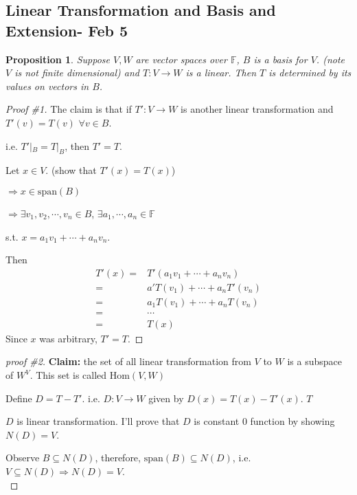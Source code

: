 \documentclass[12pt]{article}
\newtheorem{proposition}{Proposition}[subsection]
\newcommand{\Span}{\mathrm{span}}
\newcommand{\Hom}{\mathrm{Hom}}
\newcommand{\mF}{{\mathbb{F}}}
\begin{document}
	\subsection{Linear Transformation and Basis and Extension- Feb 5}
	\begin{proposition}
		Suppose $V, W$ are vector spaces over $\mF$, $B$ is a basis for $V$. 
		(note $V$ is not finite dimensional) and $T: V\to W$ is a linear.		
		Then $T$ is determined by its values on vectors in $B$. 
	\end{proposition}
	\begin{proof}[Proof \#1]
		The claim is that if $T': V\to W$ is another linear transformation
		and $T'(v) = T(v)$ $\forall v\in B$.

		i.e. $T'|_{B} = T|_B$, then $T' = T$. 

		Let $x \in V$. (show that $T'(x) = T(x)$) 
		\begin{description}
			\item $\Rightarrow x \in \Span(B)$
			\item $\Rightarrow \exists v_1, v_2,\cdots, v_n \in B$, 
				$\exists a_1,\cdots,a_n \in \mF$
		\end{description}
		s.t. $x = a_1v_1+\cdots+a_nv_n$. 
		
		Then 
		\begin{align*}	
			T'(x) 
			=& T'(a_1v_1+\cdots + a_nv_n) \\
			=& a'T(v_1)+\cdots+a_nT'(v_n) \\
			=& a_1T(v_1) + \cdots + a_nT(v_n)\\
			=& \cdots \\
			=& T(x) 
		\end{align*}
		Since $x$ was arbitrary, $T' = T$. 
	\end{proof}
	\begin{proof}[proof \#2]
		\textbf{Claim:} the set of all linear transformation from $V$ to $W$ 
		is a subspace of $W^V$. This set is called $\Hom(V,W)$

		Define $D = T-T'$.
		i.e. $D : V \to W$ given by $D(x) = T(x) - T'(x)$. $T$

		$D$ is linear transformation. I'll prove that $D$ is constant $0$
		function by showing $N(D) = V$. 

		Observe $B \subseteq N(D)$, therefore, $\Span(B) \subseteq N(D)$, 
		i.e. $V \subseteq N(D) \Rightarrow N(D) = V$.\\
	\end{proof}
\end{document}
